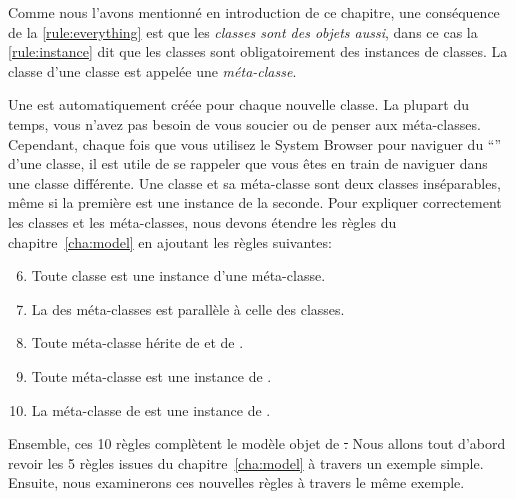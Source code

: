 \documentclass[a4paper,10pt,twoside]{book}
\begin{document}
Comme nous l'avons mentionné en introduction de ce chapitre, une conséquence de la \ref{rule:everything} est que les \emph{classes sont des objets aussi}, dans ce cas la \ref{rule:instance} dit que les classes sont obligatoirement des instances de classes.
La classe d'une classe est appelée une \emph{méta-classe}.

\label{sec:metaclassIntro}
Une  est automatiquement créée pour chaque nouvelle classe.
La plupart du temps, vous n'avez pas besoin de vous soucier ou de penser aux méta-classes.
Cependant, chaque fois que vous utilisez le System Browser pour naviguer du  ``'' d'une classe, il est utile de se rappeler que vous êtes en train de naviguer dans une classe différente.
Une classe et sa méta-classe sont deux classes inséparables, même si la première est une instance de la seconde.
Pour expliquer correctement les classes et les méta-classes, nous devons étendre les règles du chapitre~\ref{cha:model} en ajoutant les règles suivantes:

\begin{enumerate}[label={\textbf{Règle \arabic{*}}.}, ref={Règle \arabic{*}}, leftmargin=*, widest=10]
\setcounter{enumi}{5}
\item{} \label{rule:metaclass}
	Toute classe est une instance d'une méta-classe.

\item{} \label{rule:parallelhierarchy}
	La  des méta-classes est parallèle à celle des classes.

\item{} \label{rule:behavior}
	Toute méta-classe hérite de  et de .

\item{} \label{rule:metaclassclass}
	Toute méta-classe est une instance de .

\item{} \label{rule:metaclassmetaclass}
	La méta-classe de  est une instance de .

\end{enumerate}

Ensemble, ces 10 règles complètent le modèle objet de \st.
Nous allons tout d'abord revoir les 5 règles issues du chapitre~\ref{cha:model} à travers un exemple simple.
Ensuite, nous examinerons ces nouvelles règles à travers le même exemple.

\end{document}

